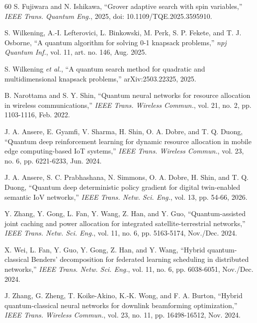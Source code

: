 \documentclass[journal]{IEEEtran}
\begin{document}
\begin{thebibliography}{60}
S. Fujiwara and N. Ishikawa, ``Grover adaptive search with spin
variables,'' \emph{IEEE Trans. Quantum Eng.}, 2025,
doi: 10.1109/TQE.2025.3595910.

S. Wilkening, A.-I. Lefterovici, L. Binkowski, M. Perk, S. P.
Fekete, and T. J. Osborne, ``A quantum algorithm for solving 0-1
knapsack problems,'' \emph{npj Quantum Inf.}, vol. 11, art. no.
146, Aug. 2025.

S. Wilkening \emph{et al.}, ``A quantum search method for quadratic
and multidimensional knapsack problems,'' arXiv:2503.22325, 2025.

B. Narottama and S. Y. Shin, ``Quantum neural networks for resource
allocation in wireless communications,'' \emph{IEEE Trans. Wireless
Commun.}, vol. 21, no. 2, pp. 1103-1116, Feb. 2022.

J. A. Ansere, E. Gyamfi, V. Sharma, H. Shin, O. A. Dobre, and
T. Q. Duong, ``Quantum deep reinforcement learning for dynamic
resource allocation in mobile edge computing-based IoT systems,''
\emph{IEEE Trans. Wireless Commun.}, vol. 23, no. 6,
pp. 6221-6233, Jun. 2024.

J. A. Ansere, S. C. Prabhashana, N. Simmons, O. A. Dobre, H. Shin,
and T. Q. Duong, ``Quantum deep deterministic policy gradient for
digital twin-enabled semantic IoV networks,'' \emph{IEEE Trans.
Netw. Sci. Eng.}, vol. 13, pp. 54-66, 2026.

Y. Zhang, Y. Gong, L. Fan, Y. Wang, Z. Han, and Y. Guo,
``Quantum-assisted joint caching and power allocation for
integrated satellite-terrestrial networks,'' \emph{IEEE Trans.
Netw. Sci. Eng.}, vol. 11, no. 6, pp. 5163-5174, Nov./Dec. 2024.

X. Wei, L. Fan, Y. Guo, Y. Gong, Z. Han, and Y. Wang, ``Hybrid
quantum-classical Benders' decomposition for federated learning
scheduling in distributed networks,'' \emph{IEEE Trans. Netw. Sci.
Eng.}, vol. 11, no. 6, pp. 6038-6051, Nov./Dec. 2024.

J. Zhang, G. Zheng, T. Koike-Akino, K.-K. Wong, and F. A. Burton,
``Hybrid quantum-classical neural networks for downlink
beamforming optimization,'' \emph{IEEE Trans. Wireless Commun.},
vol. 23, no. 11, pp. 16498-16512, Nov. 2024.


\end{thebibliography}
\end{document}
